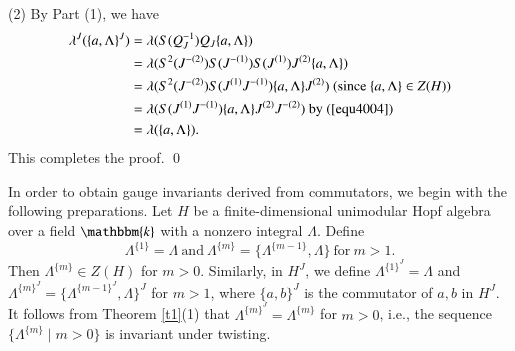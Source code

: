 \documentclass[11pt]{amsart}
\numberwithin{equation}{section}
\begin{document}
(2) By Part (1), we have
\begin{align*}
\lambda^J(\{a,\Lambda\}^J)&=\lambda(S(Q_J^{-1})Q_J\{a,\Lambda\})\\
&=\lambda(S^2(J^{-(2)})S(J^{-(1)})S(J^{(1)})J^{(2)}\{a,\Lambda\})\\
&=\lambda(S^2(J^{-(2)})S(J^{(1)}J^{-(1)})\{a,\Lambda\}J^{(2)})\ (\text{since}\ \{a,\Lambda\}\in Z(H))\\
&=\lambda(S(J^{(1)}J^{-(1)})\{a,\Lambda\}J^{(2)}J^{-(2)})\ \text{by}\ (\ref{equ4004})\\
&=\lambda(\{a,\Lambda\}).
\end{align*}
This completes the proof.
\qed

In order to obtain gauge invariants derived from commutators, we begin with the following preparations. 
Let $H$ be a finite-dimensional unimodular Hopf algebra over a field $\mathbbm{k}$ with a nonzero integral $\Lambda$. Define $$ \Lambda^{\{1\}}=\Lambda\ \text{and}\ \Lambda^{\{m\}}=\{\Lambda^{\{m-1\}},\Lambda\}\ \text{for}\ m>1.$$
Then $\Lambda^{\{m\}}\in Z(H)$ for $m>0$. Similarly, in $H^J$,  we define  $\Lambda^{\{1\}^J}=\Lambda$ and $\Lambda^{\{m\}^J}=\{\Lambda^{\{m-1\}^J},\Lambda\}^J$ for $m>1$, where $\{a,b\}^J$ is the commutator of $a,b$ in $H^J$. It follows from Theorem \ref{t1}(1) that $\Lambda^{\{m\}^J}=\Lambda^{\{m\}}$ for $m>0$, i.e., the sequence $\{\Lambda^{\{m\}}\mid m>0\}$ is invariant under twisting.
\end{document}
